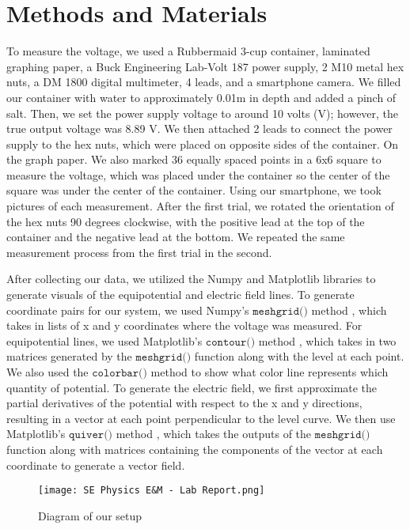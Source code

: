 \documentclass[conference]{IEEEtran}
\begin{document}
\section{Methods and Materials}
To measure the voltage, we used a Rubbermaid 3-cup container, laminated graphing paper, a Buck Engineering Lab-Volt 187 power supply, 2 M10 metal hex nuts, a DM 1800 digital multimeter, 4 leads, and a smartphone camera. We filled our container with water to approximately 0.01m in depth and added a pinch of salt. Then, we set the power supply voltage to around 10 volts (V); however, the true output voltage was 8.89 V. We then attached 2 leads to connect the power supply to the hex nuts, which were placed on opposite sides of the container. On the graph paper. We also marked 36 equally spaced points in a 6x6 square to measure the voltage, which was placed under the container so the center of the square was under the center of the container. Using our smartphone, we took pictures of each measurement. After the first trial, we rotated the orientation of the hex nuts 90 degrees clockwise, with the positive lead at the top of the container and the negative lead at the bottom. We repeated the same measurement process from the first trial in the second.

After collecting our data, we utilized the Numpy and Matplotlib libraries to generate visuals of the equipotential and electric field lines. To generate coordinate pairs for our system, we used Numpy’s $\texttt{meshgrid()}$ method \cite{b2}, which takes in lists of x and y coordinates where the voltage was measured. For equipotential lines, we used Matplotlib’s $\texttt{contour()}$ method \cite{b3, b4}, which takes in two matrices generated by the $\texttt{meshgrid()}$  function along with the level at each point. We also used the $\texttt{colorbar()}$ method to show what color line represents which quantity of potential. To generate the electric field, we first approximate the partial derivatives of the potential with respect to the x and y directions, resulting in a vector at each point perpendicular to the level curve. We then use Matplotlib’s $\texttt{quiver()}$ method \cite{b5}, which takes the outputs of the $\texttt{meshgrid()}$  function along with matrices containing the components of the vector at each coordinate to generate a vector field. 

\begin{figure}
\centerline{\texttt{[image: SE Physics E\&M - Lab Report.png]}}
\caption{Diagram of our setup}
\end{figure}
\end{document}
